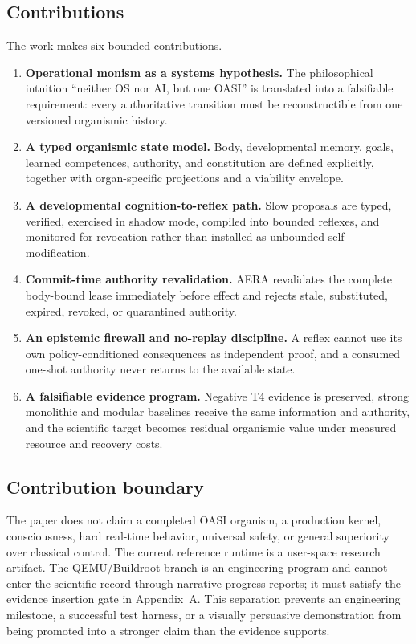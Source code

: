 \documentclass[journal,10pt]{IEEEtran}
\newcommand{\OASI}{\textsc{OASI}}
\newcommand{\AERA}{\textsc{AERA}}
\begin{document}
\subsection{Contributions}
The work makes six bounded contributions.
\begin{enumerate}
  \item \textbf{Operational monism as a systems hypothesis.} The philosophical intuition ``neither OS nor AI, but one OASI'' is translated into a falsifiable requirement: every authoritative transition must be reconstructible from one versioned organismic history.
  \item \textbf{A typed organismic state model.} Body, developmental memory, goals, learned competences, authority, and constitution are defined explicitly, together with organ-specific projections and a viability envelope.
  \item \textbf{A developmental cognition-to-reflex path.} Slow proposals are typed, verified, exercised in shadow mode, compiled into bounded reflexes, and monitored for revocation rather than installed as unbounded self-modification.
  \item \textbf{Commit-time authority revalidation.} \AERA{} revalidates the complete body-bound lease immediately before effect and rejects stale, substituted, expired, revoked, or quarantined authority.
  \item \textbf{An epistemic firewall and no-replay discipline.} A reflex cannot use its own policy-conditioned consequences as independent proof, and a consumed one-shot authority never returns to the available state.
  \item \textbf{A falsifiable evidence program.} Negative T4 evidence is preserved, strong monolithic and modular baselines receive the same information and authority, and the scientific target becomes residual organismic value under measured resource and recovery costs.
\end{enumerate}

\subsection{Contribution boundary}
The paper does not claim a completed \OASI{} organism, a production kernel, consciousness, hard real-time behavior, universal safety, or general superiority over classical control. The current reference runtime is a user-space research artifact. The QEMU/Buildroot branch is an engineering program and cannot enter the scientific record through narrative progress reports; it must satisfy the evidence insertion gate in Appendix~A. This separation prevents an engineering milestone, a successful test harness, or a visually persuasive demonstration from being promoted into a stronger claim than the evidence supports.
\end{document}
